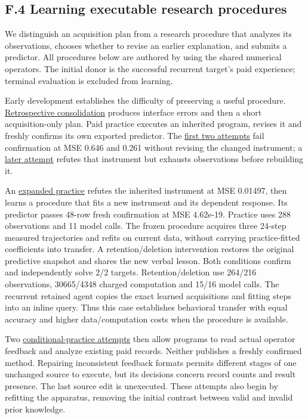 \documentclass[twoside,11pt]{article}
\begin{document}
\subsection*{F.4 Learning executable research procedures}

We distinguish an acquisition plan from a research procedure that analyzes its
observations, chooses whether to revise an earlier explanation, and submits a
predictor. All procedures below are authored by  using the shared
numerical operators. The initial donor is the successful recurrent target's paid
experience; terminal evaluation is excluded from learning.


Early development establishes the difficulty of preserving a useful procedure.
\hyperlink{artifact-58}{Retrospective consolidation}
produces interface errors and then a short acquisition-only plan. Paid practice
executes an inherited program, revises it and freshly confirms its own exported
predictor. The \hyperlink{artifact-59}{first two attempts}
fail confirmation at MSE 0.646 and 0.261 without revising the changed instrument;
a \hyperlink{artifact-60}{later attempt}
refutes that instrument but exhausts observations before rebuilding it.


An \hyperlink{artifact-61}{expanded practice}
refutes the inherited instrument at MSE 0.01497, then learns a procedure that fits
a new instrument and its dependent response. Its predictor passes 48-row fresh
confirmation at MSE 4.62e-19. Practice uses 288 observations and 11 model calls.
The frozen procedure acquires three 24-step measured trajectories and refits on
current data, without carrying practice-fitted coefficients into transfer. A
retention/deletion intervention restores the original predictive snapshot and
shares the new verbal lesson. Both conditions confirm and independently solve
2/2 targets. Retention/deletion use 264/216 observations, 30665/4348 charged
computation and 15/16 model calls. The recurrent retained agent copies the exact
learned acquisitions and fitting steps into an inline query. Thus this case
establishes behavioral transfer with equal accuracy and higher data/computation
costs when the procedure is available.


Two \hyperlink{artifact-62}{conditional-practice attempts}
then allow programs to read actual operator feedback and analyze existing paid
records. Neither publishes a freshly confirmed method. Repairing inconsistent
feedback formats permits different stages of one unchanged source to execute,
but its decisions concern record counts and result presence. The last source edit
is unexecuted. These attempts also begin by refitting the apparatus, removing the
initial contrast between valid and invalid prior knowledge.
\end{document}

